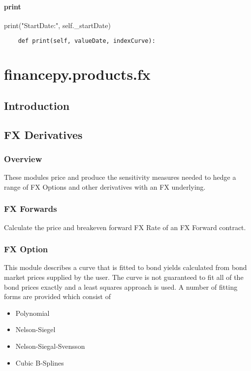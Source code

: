 \documentclass[twoside,11pt]{book}
\begin{document}
\subsubsection*{{\bf print}}
print("StartDate:", self.\_startDate) 

\begin{lstlisting}
    def print(self, valueDate, indexCurve):
\end{lstlisting}


\chapter{financepy.products.fx}
\section{Introduction}


\section*{FX Derivatives}

\subsection*{Overview}
These modules price and produce the sensitivity measures needed to hedge a range of FX Options and other derivatives with an FX underlying.


\subsection*{FX Forwards}
Calculate the price and breakeven forward FX Rate of an FX Forward contract.


\subsection*{FX Option}
This module describes a curve that is fitted to bond yields calculated from bond market prices supplied by the user. The curve is not guaranteed to fit all of the bond prices exactly and a least squares approach is used. A number of fitting forms are provided which consist of

\begin{itemize}
\item{ Polynomial
}
\item{ Nelson-Siegel
}
\item{ Nelson-Siegal-Svensson
}
\item{ Cubic B-Splines
}
\end{itemize}
\end{document}
